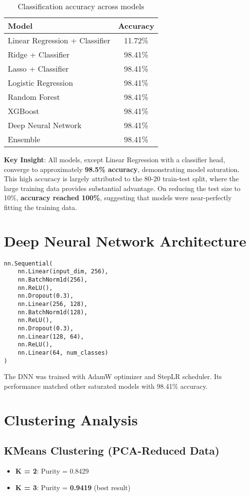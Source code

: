 \documentclass{article}
\begin{document}
\begin{table}[H]
\centering
\begin{tabular}{lc}
\toprule
\textbf{Model} & \textbf{Accuracy} \\
\midrule
Linear Regression + Classifier & 11.72\% \\
Ridge + Classifier & 98.41\% \\
Lasso + Classifier & 98.41\% \\
Logistic Regression & 98.41\% \\
Random Forest & 98.41\% \\
XGBoost & 98.41\% \\
Deep Neural Network & 98.41\% \\
Ensemble & 98.41\% \\
\bottomrule
\end{tabular}
\caption{Classification accuracy across models}
\end{table}

\textbf{Key Insight}: All models, except Linear Regression with a classifier head, converge to approximately \textbf{98.5\% accuracy}, demonstrating model saturation. This high accuracy is largely attributed to the 80-20 train-test split, where the large training data provides substantial advantage. On reducing the test size to 10\%, \textbf{accuracy reached 100\%}, suggesting that models were near-perfectly fitting the training data.

\section{Deep Neural Network Architecture}
\begin{verbatim}
nn.Sequential(
    nn.Linear(input_dim, 256),
    nn.BatchNorm1d(256),
    nn.ReLU(),
    nn.Dropout(0.3),
    nn.Linear(256, 128),
    nn.BatchNorm1d(128),
    nn.ReLU(),
    nn.Dropout(0.3),
    nn.Linear(128, 64),
    nn.ReLU(),
    nn.Linear(64, num_classes)
)
\end{verbatim}
The DNN was trained with AdamW optimizer and StepLR scheduler. Its performance matched other saturated models with 98.41\% accuracy.

\section{Clustering Analysis}

\subsection*{KMeans Clustering (PCA-Reduced Data)}
\begin{itemize}
    \item \textbf{K = 2}: Purity = 0.8429
    \item \textbf{K = 3}: Purity = \textbf{0.9419} (best result)
\end{itemize}
\end{document}
